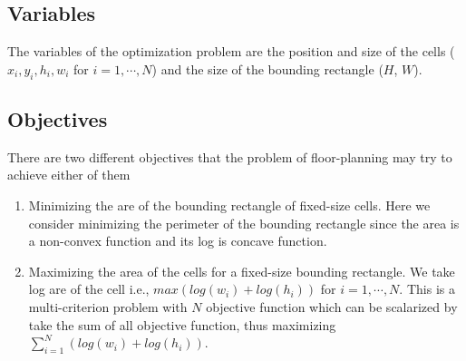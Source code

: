 \documentclass[12pt] {article}
\begin{document}
\subsection*{Variables}
The variables of the optimization problem are the position and size of the cells ($x_{i}, y_{i}, h_{i}, w_{i}$ for $i=1,\cdots, N$) and the size of the bounding rectangle ($H$, $W$). 
\subsection*{Objectives} 
There are two different objectives that the problem of floor-planning may try to achieve either of them 
\begin{enumerate}
\item Minimizing the are of the bounding rectangle of fixed-size cells. Here we consider minimizing the perimeter of the bounding rectangle since the area is a non-convex function and its log is concave function.
\item Maximizing the area of the cells for a fixed-size bounding rectangle. We take log are of the cell i.e., $max (log(w_{i})+log(h_{i}))$ for $i=1,\cdots, N$. This is a multi-criterion problem with $N$ objective function which can be scalarized by take the sum of all objective function, thus maximizing $\sum_{i=1}^{N}(log(w_{i})+log(h_{i}))$.
\end{enumerate}
\end{document}
